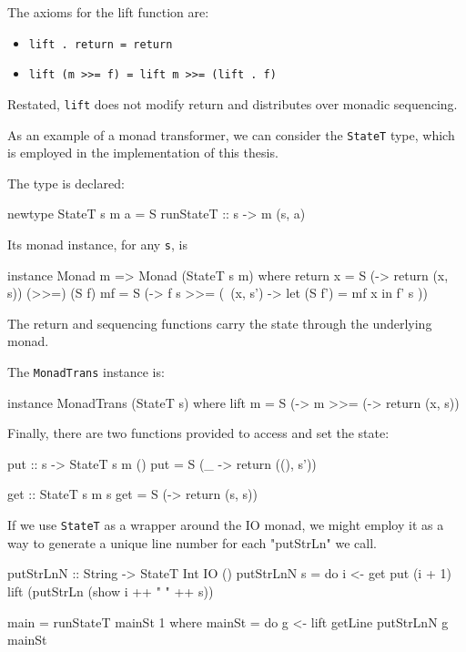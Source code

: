\begin{code}
The axioms for the lift function are:
\begin{itemize}
\item {\tt lift . return = return}
\item {\tt lift (m >>= f) = lift m >>= (lift . f)}
\end{itemize}

Restated, {\tt lift} does not modify return and distributes over monadic
sequencing.

As an example of a monad transformer, we can consider the {\tt StateT} type,
which is employed in the implementation of this thesis.

The type is declared:
\begin{code}
newtype StateT s m a = S { runStateT :: s -> m (s, a) }
\end{code}

Its monad instance, for any {\tt s}, is

\begin{code}
instance Monad m => Monad (StateT s m) where
  return x  = S (\s -> return (x, s))
  (>>=) (S f) mf = S (\s -> f s >>= (\ (x, s') -> let (S f') = mf x in f' s ))
\end{code}

The return and sequencing functions carry the state through the underlying monad.

The {\tt MonadTrans} instance is:
\begin{code}
instance MonadTrans (StateT s) where
  lift m = S (\s -> m >>= (\x -> return (x, s))
\end{code}

Finally, there are two functions provided to access and set the state:

\begin{code}
put :: s -> StateT s m ()
put = S (\_ -> return ((), s'))

get :: StateT s m s
get = S (\s -> return (s, s))
\end{code}

If we use {\tt StateT} as a wrapper around the IO monad, we might employ it as
a way to generate a unique line number for each "putStrLn" we call.

\begin{code}
putStrLnN :: String -> StateT Int IO ()
putStrLnN s = do i <- get
                 put (i + 1)
                 lift (putStrLn (show i ++ " " ++ s))

main = runStateT mainSt 1
  where mainSt = do g <- lift getLine
                    putStrLnN g
                    mainSt
\end{code}


\end{code}

